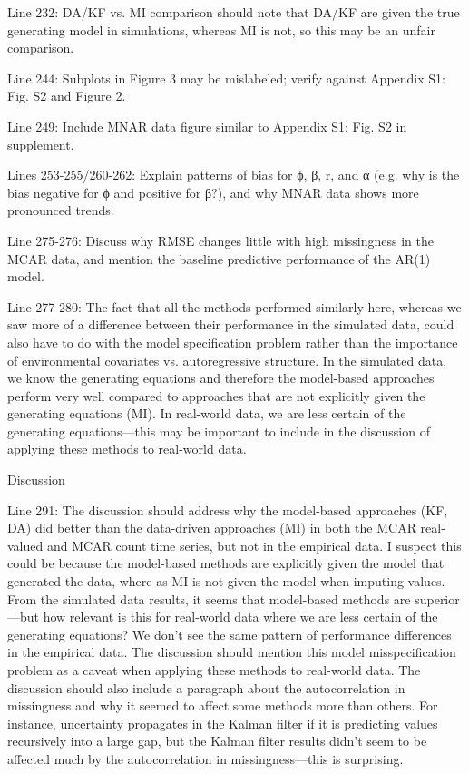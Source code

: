 \documentclass{article}
\begin{document}
Line 232: DA/KF vs. MI comparison should note that DA/KF are given the true generating model in simulations, whereas MI is not, so this may be an unfair comparison.

Line 244: Subplots in Figure 3 may be mislabeled; verify against Appendix S1: Fig. S2 and Figure 2.

Line 249: Include MNAR data figure similar to Appendix S1: Fig. S2 in supplement.

Lines 253-255/260-262: Explain patterns of bias for ϕ, β, r, and α (e.g. why is the bias negative for ϕ and positive for β?), and why MNAR data shows more pronounced trends.

Line 275-276: Discuss why RMSE changes little with high missingness in the MCAR data, and mention the baseline predictive performance of the AR(1) model.

Line 277-280: The fact that all the methods performed similarly here, whereas we saw more of a difference between their performance in the simulated data, could also have to do with the model specification problem rather than the importance of environmental covariates vs. autoregressive structure. In the simulated data, we know the generating equations and therefore the model-based approaches perform very well compared to approaches that are not explicitly given the generating equations (MI). In real-world data, we are less certain of the generating equations—this may be important to include in the discussion of applying these methods to real-world data. 

Discussion

Line 291: The discussion should address why the model-based approaches (KF, DA) did better than the data-driven approaches (MI) in both the MCAR real-valued and MCAR count time series, but not in the empirical data. I suspect this could be because the model-based methods are explicitly given the model that generated the data, where as MI is not given the model when imputing values. From the simulated data results, it seems that model-based methods are superior—but how relevant is this for real-world data where we are less certain of the generating equations? We don’t see the same pattern of performance differences in the empirical data. The discussion should mention this model misspecification problem as a caveat when applying these methods to real-world data. The discussion should also include a paragraph about the autocorrelation in missingness and why it seemed to affect some methods more than others. For instance, uncertainty propagates in the Kalman filter if it is predicting values recursively into a large gap, but the Kalman filter results didn’t seem to be affected much by the autocorrelation in missingness—this is surprising.
\end{document}
